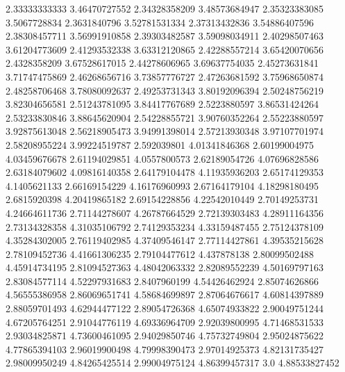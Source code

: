   2.33333333333    3.46470727552
  2.34328358209    3.48573684947
  2.35323383085     3.5067728834
   2.3631840796    3.52781531334
  2.37313432836    3.54886407596
  2.38308457711    3.56991910858
  2.39303482587    3.59098034911
  2.40298507463    3.61204773609
  2.41293532338    3.63312120865
  2.42288557214    3.65420070656
   2.4328358209    3.67528617015
  2.44278606965    3.69637754035
  2.45273631841    3.71747475869
  2.46268656716    3.73857776727
  2.47263681592    3.75968650874
  2.48258706468    3.78080092637
  2.49253731343    3.80192096394
  2.50248756219    3.82304656581
  2.51243781095    3.84417767689
   2.5223880597    3.86531424264
  2.53233830846    3.88645620904
  2.54228855721    3.90760352264
  2.55223880597    3.92875613048
  2.56218905473    3.94991398014
  2.57213930348    3.97107701974
  2.58208955224    3.99224519787
    2.592039801    4.01341846368
  2.60199004975    4.03459676678
  2.61194029851     4.0557800573
  2.62189054726    4.07696828586
  2.63184079602    4.09816140358
  2.64179104478    4.11935936203
  2.65174129353     4.1405621133
  2.66169154229    4.16176960993
  2.67164179104    4.18298180495
   2.6815920398    4.20419865182
  2.69154228856    4.22542010449
  2.70149253731    4.24664611736
  2.71144278607    4.26787664529
  2.72139303483    4.28911164356
  2.73134328358    4.31035106792
  2.74129353234    4.33159487455
  2.75124378109    4.35284302005
  2.76119402985    4.37409546147
  2.77114427861    4.39535215628
  2.78109452736    4.41661306235
  2.79104477612      4.437878138
  2.80099502488    4.45914734195
  2.81094527363    4.48042063332
  2.82089552239    4.50169797163
  2.83084577114    4.52297931683
   2.8407960199    4.54426462924
  2.85074626866    4.56555386958
  2.86069651741    4.58684699897
  2.87064676617    4.60814397889
  2.88059701493    4.62944477122
  2.89054726368    4.65074933822
  2.90049751244    4.67205764251
  2.91044776119    4.69336964709
  2.92039800995    4.71468531533
  2.93034825871    4.73600461095
  2.94029850746    4.75732749804
  2.95024875622    4.77865394103
  2.96019900498    4.79998390473
  2.97014925373    4.82131735427
  2.98009950249    4.84265425514
  2.99004975124    4.86399457317
            3.0    4.88533827452
